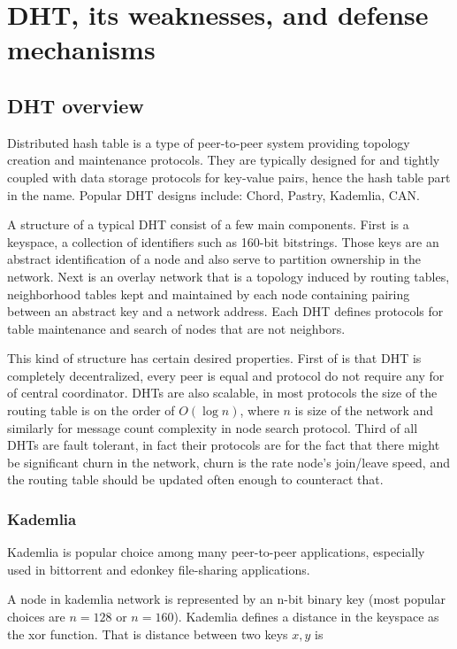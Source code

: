 \chapter{DHT, its weaknesses, and defense mechanisms}
\section{DHT overview}

  Distributed hash table is a type of peer-to-peer system providing topology
  creation and maintenance protocols. They are typically designed for and
  tightly coupled with data storage protocols for key-value pairs, hence the
  hash table part in the name. Popular DHT designs include: Chord, Pastry,
  Kademlia, CAN.

  A structure of a typical DHT consist of a few main components. First is a
  keyspace, a collection of identifiers such as 160-bit bitstrings. Those keys
  are an abstract identification of a node and also serve to partition ownership
  in the network. Next is an overlay network that is a topology induced by
  routing tables, neighborhood tables kept and maintained by each node
  containing pairing between an abstract key and a network address. Each DHT
  defines protocols for table maintenance and search of nodes that are not
  neighbors.

  This kind of structure has certain desired properties. First of is that DHT is
  completely decentralized, every peer is equal and protocol do not require any
  for of central coordinator. DHTs are also scalable, in most protocols the size
  of the routing table is on the order of $O(\log n)$, where $n$ is size of the
  network and similarly for message count complexity in node search protocol.
  Third of all DHTs are fault tolerant, in fact their protocols are for the fact
  that there might be significant churn in the network, churn is the rate node's
  join/leave speed, and the routing table should be updated often enough to
  counteract that.
 
  \subsection{Kademlia}
  Kademlia \cite{may02} is popular choice among many peer-to-peer applications,
  especially used in bittorrent and edonkey file-sharing applications.

  A node in kademlia network is represented by an n-bit binary key (most popular
  choices are $n = 128$ or $n = 160$). Kademlia defines a distance in the
  keyspace as the xor function. That is distance between two keys $x, y$ is

